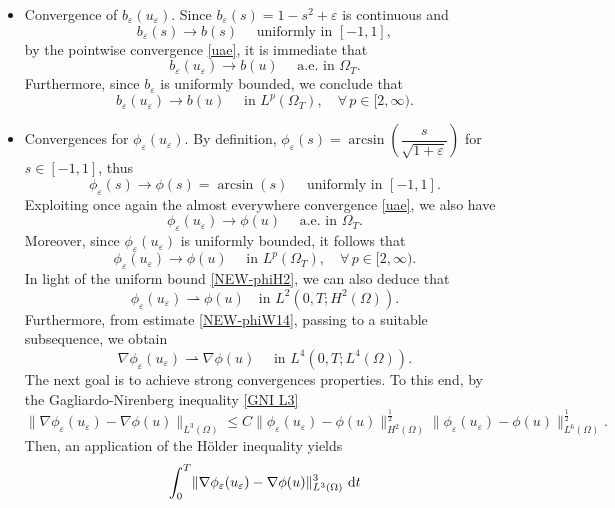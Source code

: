 \documentclass[11pt,  reqno]{amsart}%
\theoremstyle{plain}
\theoremstyle{definition}
\theoremstyle{remark}
\numberwithin{equation}{section}
\newcommand{\ve}{\varepsilon}
\newcommand{\dt}{\textup{d}t}
\begin{document}
\begin{itemize}
    \item Convergence of $b_\ve(u_\ve)$. Since $b_\ve(s)= 1-s^2+\ve$ is continuous and 
    $$b_\ve(s) \to b(s) \quad\textrm{ uniformly in }[-1,1],$$
    by the pointwise convergence \eqref{uae}, it is immediate that
    \begin{equation}
    \label{pointwise conv b}
    b_\ve(u_\ve)\to b(u) \quad \textrm{ a.e. in }\Omega_T.
    \end{equation}
    Furthermore, since $b_\ve$ is uniformly bounded, we conclude that
    \begin{equation}
        \label{convb}
        b_\ve(u_\ve) \to b(u) \quad  \textrm{ in }L^p(\Omega_T), \quad \forall \, p\in [2,\infty).
    \end{equation}
    \item Convergences for $\phi_\ve(u_\ve)$. By definition, $\phi_\ve(s)= \arcsin \left( \dfrac{s}{\sqrt{1+\ve}}\right)$ for $s\in [-1,1]$, thus
    $$\phi_\ve(s) \to \phi(s)=\arcsin(s) \quad\textrm{ uniformly in }[-1,1].$$
    Exploiting once again the almost everywhere convergence \eqref{uae}, we also have
    $$\phi_\ve(u_\ve) \to \phi(u)\quad\textrm{ a.e. in }\Omega_T.$$
    Moreover, since $\phi_\ve(u_\ve)$ is uniformly bounded, it follows that
    \begin{equation}
        \label{convphi}
        \phi_\ve(u_\ve) \to \phi(u) \quad \textrm{ in }L^p(\Omega_T), \quad 
        \forall \, p\in [2,\infty).
    \end{equation}
    In light of the uniform bound \eqref{NEW-phiH2}, we can also deduce that
    \begin{equation}
        \phi_{\ve}(u_{\ve}) \rightharpoonup \phi(u) \quad \mbox{in } L^2(0,T; H^2(\Omega)).\label{conv6}
    \end{equation}
   Furthermore, from estimate \eqref{NEW-phiW14}, passing to a suitable subsequence, we obtain
    $$
    \nabla \phi_\ve(u_\ve) \rightharpoonup \nabla \phi(u) \quad \textrm{ in }L^4(0,T; L^4(\Omega)).
    $$
    The next goal is to achieve strong convergences properties. 
     To this end, by the Gagliardo-Nirenberg inequality \eqref{GNI L3}
 $$
 \|\nabla \phi_\ve(u_\ve)-\nabla \phi(u)\|_{L^3(\Omega)}\le C \|\phi_\ve(u_\ve)-\phi(u)\|^{\frac12}_{H^2(\Omega)}\|\phi_\ve(u_\ve)-\phi(u)\|^{\frac12}_{L^6(\Omega)}.
 $$
Then, an application of the H\"older inequality yields
 \begin{align*}
   \int_0^T & \|\nabla \phi_\ve(u_\ve)-\nabla \phi(u)\|_{L^3(\Omega)}^3 \ \dt 
   \\ %
        & \qquad

\end{align*}
\end{itemize}
\end{document}
